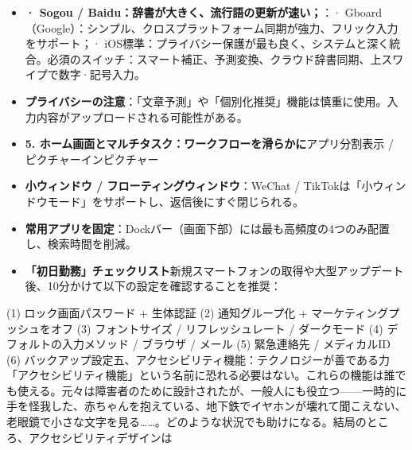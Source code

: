 
\begin{itemize}
  \item \textbf{· Sogou / Baidu：辞書が大きく、流行語の更新が速い；}：\newline · Gboard（Google）：シンプル、クロスプラットフォーム同期が強力、フリック入力をサポート；\newline · iOS標準：プライバシー保護が最も良く、システムと深く統合。\newline 必須のスイッチ\newline ：スマート補正、予測変換、クラウド辞書同期、上スワイプで数字·記号入力。
  \item \textbf{プライバシーの注意}：「文章予測」や「個別化推奨」機能は慎重に使用。入力内容がアップロードされる可能性がある。
  \item \textbf{5. ホーム画面とマルチタスク：ワークフローを滑らかに}アプリ分割表示 / ピクチャーインピクチャー
\end{itemize}


\begin{itemize}
  \item \textbf{小ウィンドウ / フローティングウィンドウ}：WeChat / TikTokは「小ウィンドウモード」をサポートし、返信後にすぐ閉じられる。
  \item \textbf{常用アプリを固定}：Dockバー（画面下部）には最も高頻度の4つのみ配置し、検索時間を削減。
  \item \textbf{「初日勤務」チェックリスト}新規スマートフォンの取得や大型アップデート後、10分かけて以下の設定を確認することを推奨：
\end{itemize}

\begin{tcbinfo}{(1) ロック画面パスワード + 生体認証 (2) 通知グループ化 + マーケティングプッシュをオフ (3) フォントサイズ / リフレッシュレート / ダークモード}
(4) デフォルトの入力メソッド / ブラウザ / メール (5) 緊急連絡先 / メディカルID (6) バックアップ設定\newline 五、アクセシビリティ機能：テクノロジーが善である力\newline 「アクセシビリティ機能」という名前に恐れる必要はない。これらの機能は誰でも使える。元々は障害者のために設計されたが、一般人にも役立つ——一時的に手を怪我した、赤ちゃんを抱えている、地下鉄でイヤホンが壊れて聞こえない、老眼鏡で小さな文字を見る……。どのような状況でも助けになる。結局のところ、アクセシビリティデザインは

\end{tcbinfo}

